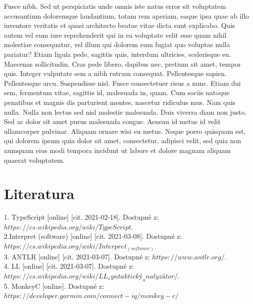 \documentclass[czech,master,dept460,male,cpp,cpdeclaration]{diploma}
\begin{document}
Fusce nibh. Sed ut perspiciatis unde omnis iste natus error sit voluptatem accusantium doloremque laudantium, totam rem aperiam, eaque ipsa quae ab illo inventore veritatis et quasi architecto beatae vitae dicta sunt explicabo. Quis autem vel eum iure reprehenderit qui in ea voluptate velit esse quam nihil molestiae consequatur, vel illum qui dolorem eum fugiat quo voluptas nulla pariatur? Etiam ligula pede, sagittis quis, interdum ultricies, scelerisque eu. Maecenas sollicitudin. Cras pede libero, dapibus nec, pretium sit amet, tempor quis. Integer vulputate sem a nibh rutrum consequat. Pellentesque sapien. Pellentesque arcu. Suspendisse nisl. Fusce consectetuer risus a nunc. Etiam dui sem, fermentum vitae, sagittis id, malesuada in, quam. Cum sociis natoque penatibus et magnis dis parturient montes, nascetur ridiculus mus. Nam quis nulla. Nulla non lectus sed nisl molestie malesuada. Duis viverra diam non justo. Sed ac dolor sit amet purus malesuada congue. Aenean id metus id velit ullamcorper pulvinar. Aliquam ornare wisi eu metus. Neque porro quisquam est, qui dolorem ipsum quia dolor sit amet, consectetur, adipisci velit, sed quia non numquam eius modi tempora incidunt ut labore et dolore magnam aliquam quaerat voluptatem.

\section{Literatura}
1. TypeScript [online] [cit. 2021-02-18]. Dostupné z: $https://cs.wikipedia.org/wiki/TypeScript$.\\
2.Interpret (software) [online] [cit. 2021-03-08]. Dostupné z: $https://cs.wikipedia.org/wiki/Interpret_(software)$.\\
3. ANTLR [online] [cit. 2021-03-07]. Dostupné z: $https://www.antlr.org/$.\\
4. LL [online] [cit. 2021-03-07]. Dostupné z: $https://cs.wikipedia.org/wiki/LL_syntaktický_analyzátor/$.\\
5. MonkeyC [online]. Dostupné z: $https://developer.garmin.com/connect-iq/monkey-c/$



\printbibliography[title={Literatura}, heading=bibintoc]
\end{document}
